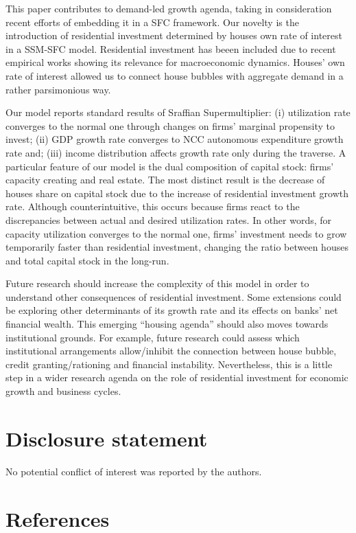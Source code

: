 \documentclass[12pt]{article}
\begin{document}
This paper contributes to demand-led growth agenda, taking in consideration recent efforts of embedding it in a SFC framework.
Our novelty is the introduction of residential investment determined by houses own rate of interest in a SSM-SFC model.
Residential investment has beeen included due to recent empirical works showing its relevance for macroeconomic dynamics.
Houses' own rate of interest allowed us to connect house bubbles with aggregate demand in a rather parsimonious way.

Our model reports standard results of Sraffian Supermultiplier:
    (i) utilization rate converges to the normal one through changes on firms' marginal propensity to invest;
    (ii) GDP growth rate converges to NCC autonomous expenditure growth rate and;
    (iii) income distribution affects growth rate only during the traverse.
A particular feature of our model is the dual composition of capital stock: firms' capacity creating and real estate.
The most distinct result is the decrease of houses share on capital stock due to the increase of residential investment growth rate.
Although counterintuitive, this occurs because firms react to the discrepancies between actual and desired utilization rates.
In other words, for capacity utilization converges to the normal one,  firms' investment needs to grow temporarily faster than residential investment, changing the ratio between houses and total capital stock in the long-run.

Future research should increase the complexity of this model in order to understand other consequences of residential investment.
Some extensions could be exploring other determinants of its growth rate and  its effects on banks' net financial wealth.
This emerging ``housing agenda'' should also moves towards institutional grounds.
For example, future research could assess which institutional arrangements allow/inhibit the connection between house bubble, credit granting/rationing and financial instability.
Nevertheless, this is a little step in a wider research agenda on the role of residential investment for economic growth and business cycles.


\section*{Disclosure statement}
\label{sec:orgb16f4bf}
No potential conflict of interest was reported by the authors.


\section*{References}
\label{sec:org8550ffb}
\printbibliography[heading=none]
\end{document}
